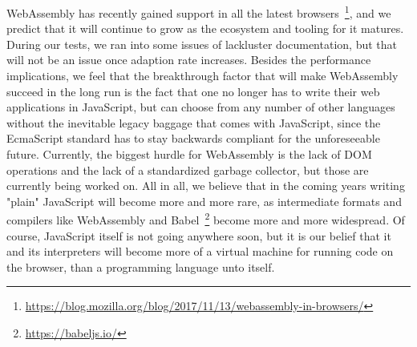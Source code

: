 \documentclass[conference]{IEEEtran}
\begin{document}
WebAssembly has recently gained support in all the latest
browsers~\footnote{\url{https://blog.mozilla.org/blog/2017/11/13/webassembly-in-browsers/}},
and we predict that it will continue to grow as the ecosystem and tooling for
it matures. During our tests, we ran into some issues of lackluster
documentation, but that will not be an issue once adaption rate increases.
Besides the performance implications, we feel that the breakthrough factor that
will make WebAssembly succeed in the long run is the fact that one no longer
has to write their web applications in JavaScript, but can choose from any
number of other languages without the inevitable legacy baggage that comes with
JavaScript, since the EcmaScript standard has to stay backwards compliant for
the unforeseeable future. Currently, the biggest hurdle for WebAssembly is the
lack of DOM operations and the lack of a standardized garbage collector, but
those are currently being worked on. All in all, we believe that in the coming
years writing "plain" JavaScript will become more and more rare, as
intermediate formats and compilers like WebAssembly and
Babel~\footnote{\url{https://babeljs.io/}} become more and more widespread. Of
course, JavaScript itself is not going anywhere soon, but it is our belief that
it and its interpreters will become more of a virtual machine for running code
on the browser, than a programming language unto itself.



\end{document}
